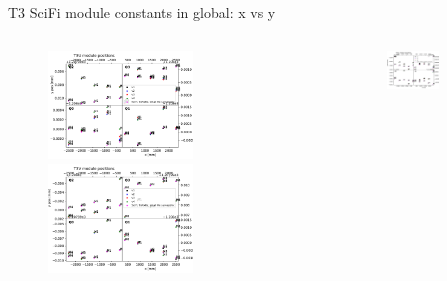 \documentclass[aspectratio=1610, 12pt]{beamer}
\begin{document}
\begin{frame}{T3 SciFi module constants in global: x vs y}
  \begin{columns}
    \begin{column}[c]{0.5\textwidth}
      \begin{figure}
        \includegraphics[width=0.61\textwidth]{plots/out_x_y_pos/retest_x_vs_zT3U.pdf}
        \includegraphics[width=0.61\textwidth]{plots/out_x_y_pos/retest_x_vs_zT3V.pdf}
      \end{figure}
    \end{column}
    \begin{column}[c]{0.5\textwidth}
      \begin{figure}
        \includegraphics[width=0.61\textwidth]{plots/out_x_y_pos/retest_x_vs_zT3X1.pdf}

\end{figure}
\end{column}
\end{columns}
\end{frame}
\end{document}
